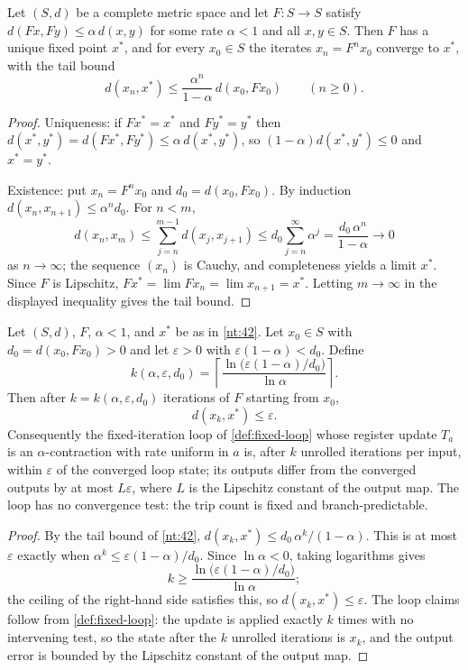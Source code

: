\begin{theorem}\label{nt:42}
Let $(S,d)$ be a complete metric space and let $F \colon S \to S$ satisfy $d(Fx,Fy) \leq \alpha\,d(x,y)$ for some rate $\alpha < 1$ and all $x,y \in S$. Then $F$ has a unique fixed point $x^{*}$, and for every $x_0 \in S$ the iterates $x_n = F^n x_0$ converge to $x^{*}$, with the tail bound
\[ d(x_n,x^{*}) \leq \frac{\alpha^n}{1-\alpha}\,d(x_0,Fx_0) \qquad (n \geq 0). \]
\end{theorem}

\begin{proof}
Uniqueness: if $Fx^{*} = x^{*}$ and $Fy^{*} = y^{*}$ then $d(x^{*},y^{*}) = d(Fx^{*},Fy^{*}) \leq \alpha\,d(x^{*},y^{*})$, so $(1-\alpha)d(x^{*},y^{*}) \leq 0$ and $x^{*} = y^{*}$.

Existence: put $x_n = F^n x_0$ and $d_0 = d(x_0,Fx_0)$. By induction $d(x_n,x_{n+1}) \leq \alpha^n d_0$. For $n < m$,
\[ d(x_n,x_m) \leq \sum_{j=n}^{m-1} d(x_j,x_{j+1}) \leq d_0 \sum_{j=n}^{\infty} \alpha^{j} = \frac{d_0\,\alpha^n}{1-\alpha} \longrightarrow 0 \]
as $n \to \infty$; the sequence $(x_n)$ is Cauchy, and completeness yields a limit $x^{*}$. Since $F$ is Lipschitz, $Fx^{*} = \lim Fx_n = \lim x_{n+1} = x^{*}$. Letting $m \to \infty$ in the displayed inequality gives the tail bound.
\end{proof}

\begin{theorem}\label{nt:43}
Let $(S,d)$, $F$, $\alpha < 1$, and $x^{*}$ be as in \autoref{nt:42}. Let $x_0 \in S$ with $d_0 = d(x_0,Fx_0) > 0$ and let $\varepsilon > 0$ with $\varepsilon(1-\alpha) < d_0$. Define
\[ k(\alpha,\varepsilon,d_0) = \left\lceil \frac{\ln\bigl(\varepsilon(1-\alpha)/d_0\bigr)}{\ln \alpha} \right\rceil. \]
Then after $k = k(\alpha,\varepsilon,d_0)$ iterations of $F$ starting from $x_0$,
\[ d(x_k,x^{*}) \leq \varepsilon . \]
Consequently the fixed-iteration loop of \autoref{def:fixed-loop} whose register update $T_a$ is an $\alpha$-contraction with rate uniform in $a$ is, after $k$ unrolled iterations per input, within $\varepsilon$ of the converged loop state; its outputs differ from the converged outputs by at most $L\varepsilon$, where $L$ is the Lipschitz constant of the output map. The loop has no convergence test: the trip count is fixed and branch-predictable.
\end{theorem}

\begin{proof}
By the tail bound of \autoref{nt:42}, $d(x_k,x^{*}) \leq d_0\,\alpha^k/(1-\alpha)$. This is at most $\varepsilon$ exactly when $\alpha^k \leq \varepsilon(1-\alpha)/d_0$. Since $\ln \alpha < 0$, taking logarithms gives
\[ k \geq \frac{\ln\bigl(\varepsilon(1-\alpha)/d_0\bigr)}{\ln \alpha}; \]
the ceiling of the right-hand side satisfies this, so $d(x_k,x^{*}) \leq \varepsilon$. The loop claims follow from \autoref{def:fixed-loop}: the update is applied exactly $k$ times with no intervening test, so the state after the $k$ unrolled iterations is $x_k$, and the output error is bounded by the Lipschitz constant of the output map.
\end{proof}

